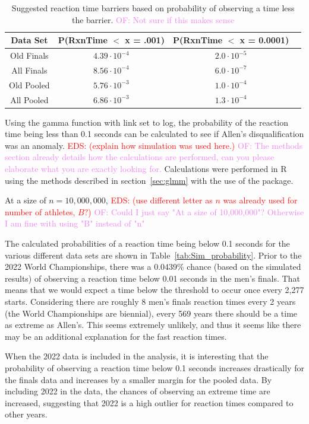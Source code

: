 \documentclass[12pt, letterpaper, titlepage]{article}
\newcommand{\eds}[1]{\textcolor{red}{EDS: (#1)}}
\newcommand{\of}[1]{\textcolor{violet}{OF: #1}}
\begin{document}
\begin{table}
  \centering
  \caption{Suggested reaction time barriers based on probability of observing
  a time less the barrier. \of{Not sure if this makes sense}}
  \begin{tabular}{c c c c} 
   \toprule
   Data Set & P(RxnTime $<$ x = .001) & P(RxnTime $<$ x = 0.0001) \\ 
   \midrule
   Old Finals & $4.39\cdot10^{-4}$ & $2.0\cdot10^{-5}$ \\
   All Finals & $8.56\cdot10^{-4}$ & $6.0\cdot10^{-7}$ \\
   Old Pooled & $5.76\cdot10^{-3}$ & $1.0\cdot10^{-4}$ \\ 
   All Pooled & $6.86\cdot10^{-3}$ & $1.3\cdot10^{-4}$ \\
   \bottomrule
  \end{tabular}
  \label{tab:ExpectedValues}
\end{table}


Using the gamma function with link set to log, the probability of the reaction 
time being less than 0.1 seconds can be calculated to see if Allen's 
disqualification was an anomaly. 
\eds{explain how simulation was used here.} \of{The methods section already
details how the calculations are performed, can you please elaborate what you
are exactly looking for.}
Calculations were performed in R using the methods described in 
section~\ref{sec:glmm} with the use of the \citet{lme4} package.


At a size of $n=10,000,000$, \eds{use different letter as $n$ was already used 
for number of athletes, $B?$} \of{Could I just say "At a size of 10,000,000"? 
Otherwise I am fine with using "B" instead of "n"}


The calculated probabilities of a reaction time 
being below 0.1 seconds for the various different data sets are shown in 
Table~\ref{tab:Sim_probability}. Prior to the 2022 World Championships, there was 
a 0.0439\% chance (based on the
simulated results) of observing a reaction time below 0.01 seconds in the men's
finals.
That means that we would expect a time below the threshold to occur
once every 2,277 starts.  Considering there are roughly 8 men's finals reaction
times every 2 years (the World Championships are biennial), every 569 years there
should be a time as extreme as Allen's. This seems extremely unlikely, and thus
it seems like there may be an additional explanation for the fast reaction times.


When the 2022 data is included in the analysis, it is interesting that the 
probability of observing a reaction time below 0.1 seconds increases drastically 
for the finals data and increases by a smaller margin for the pooled data.  By
including 2022 in the data, the chances of observing an extreme time are 
increased, suggesting that 2022 is a high outlier for reaction times compared to
 other years.
\end{document}
